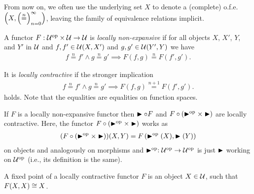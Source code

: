 \documentclass[format=acmsmall, review=true, screen=true]{acmart}
\newcommand{\nequal}[1][n]{\stackrel{\tiny{#1}}{=}}
\begin{document}
From now on, we often use the underlying set $X$ to denote a (complete) o.f.e. $\left(X,
  \seqn{\nequal}\right)$, leaving the family of equivalence
relations implicit.

\begin{definition}
 \label{def:nonexpansive-loc-contractive-functor}
 A functor $F : \mathcal{U}^{\text{op}} \times \mathcal{U} \to \mathcal{U}$ is \emph{locally non-expansive}  if for all
 objects $X$, $X'$, $Y$, and $Y'$ in $\mathcal{U}$ and
 $f, f' \in \mathcal{U}(X,X')$ and $g, g' \in \mathcal{U}(Y',Y)$ we have
 \begin{align*}
   f \overset{n}{=} f' \land g \overset{n}{=} g' \implies F(f, g) \overset{n}{=} F(f', g').
 \end{align*}

 It is \emph{locally contractive} if the stronger implication
 \begin{align*}
   f \overset{n}{=} f' \land g \overset{n}{=} g' \implies F(f, g) \overset{n+1}{=} F(f', g').
 \end{align*}
 holds. Note that the equalities are equalities on function spaces.
\end{definition}

\begin{proposition}
  \label{prop:loc-nonexp-loc-contr}
  If $F$ is a locally non-expansive functor then $\blacktriangleright \circ F$ and $F \circ \left(\blacktriangleright^{\text{op}}
  \times \blacktriangleright\right)$ are locally contractive. Here, the functor $F \circ \left(\blacktriangleright^{\text{op}} \times
  \blacktriangleright\right)$ works as
  \begin{align*}
    (F \circ (\blacktriangleright^{\text{op}} \times \blacktriangleright))(X, Y) = F\left(\blacktriangleright^{\text{op}}(X), \blacktriangleright(Y)\right)
  \end{align*}
  on objects and analogously on morphisms and
  $\blacktriangleright^{\text{op}} : \mathcal{U}^{\text{op}} \to \mathcal{U}^{\text{op}}$ is just $\blacktriangleright$ working on $\mathcal{U}^{\text{op}}$ (i.e., its
  definition is the same).
\end{proposition}

\begin{definition}
 \label{def:fixed-point}
 A fixed point of a locally contractive functor $F$ is an object $X \in \mathcal{U}$, such that
 $F(X, X) \cong X$.
\end{definition}
\end{document}
